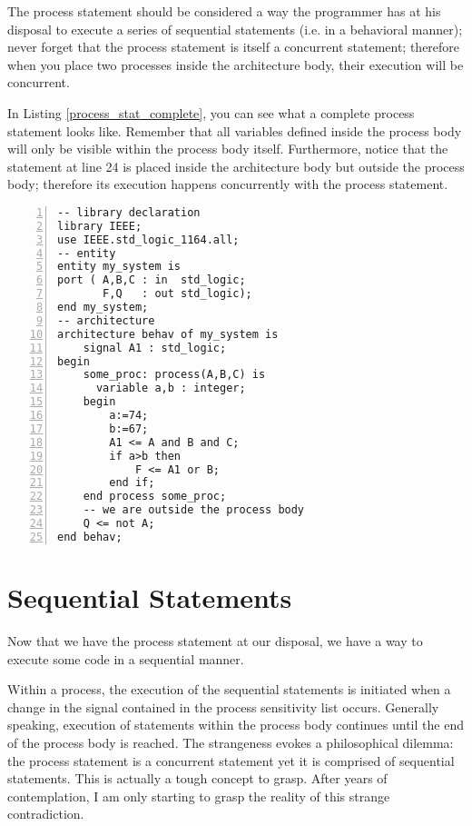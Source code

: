 The process statement should be considered a way the programmer has at his disposal to execute a series of sequential statements (i.e. in a behavioral manner); never forget that the process statement is itself a concurrent statement; therefore when you place two processes inside the architecture body, their execution will be concurrent.

In Listing \ref{process_stat_complete}, you can see what a complete process statement looks like. Remember that all variables defined inside the process body will only be visible within the process body itself. Furthermore, notice that the statement at line 24 is placed inside the architecture body but outside the process body; therefore its execution happens concurrently with the process statement.

\begin{lstlisting}[float, numbers=left,label=process_stat_complete, caption=Use of the process statement.]
-- library declaration
library IEEE;
use IEEE.std_logic_1164.all;
-- entity
entity my_system is
port ( A,B,C : in  std_logic;
       F,Q   : out std_logic);
end my_system;
-- architecture
architecture behav of my_system is
	signal A1 : std_logic;
begin
	some_proc: process(A,B,C) is
	  variable a,b : integer;
	begin
		a:=74;
		b:=67;
		A1 <= A and B and C;
		if a>b then
            F <= A1 or B;
		end if;
	end process some_proc;
	-- we are outside the process body	
	Q <= not A;
end behav;
\end{lstlisting}

\section{Sequential Statements}
Now that we have the process statement at our disposal, we have a way to execute some code in a sequential manner.

Within a process, the execution of the sequential statements is initiated when a change in the signal contained in the process sensitivity list occurs. Generally speaking, execution of statements within the process body continues until the end of the process body is reached. The strangeness evokes a philosophical dilemma: the process statement is a concurrent statement yet it is comprised of sequential statements. This is actually a tough concept to grasp. After years of contemplation, I am only starting to grasp the reality of this strange contradiction. 

